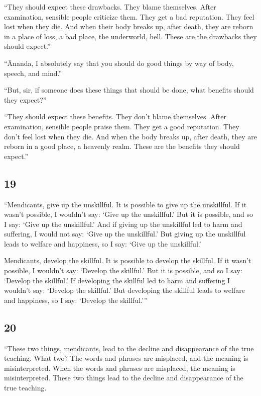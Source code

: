 \documentclass[12pt,openany]{book}%
\begin{document}
“They should expect these drawbacks. They blame themselves. After examination, sensible people criticize them. They get a bad reputation. They feel lost when they die. And when their body breaks up, after death, they are reborn in a place of loss, a bad place, the underworld, hell. These are the drawbacks they should expect.” 

“Ānanda, I absolutely say that you should do good things by way of body, speech, and mind.” 

“But, sir, if someone does these things that should be done, what benefits should they expect?” 

“They should expect these benefits. They don’t blame themselves. After examination, sensible people praise them. They get a good reputation. They don’t feel lost when they die. And when the body breaks up, after death, they are reborn in a good place, a heavenly realm. These are the benefits they should expect.” 

\subsection*{19 }

“Mendicants, give up the unskillful. It is possible to give up the unskillful. If it wasn’t possible, I wouldn’t say: ‘Give up the unskillful.’ But it is possible, and so I say: ‘Give up the unskillful.’ And if giving up the unskillful led to harm and suffering, I would not say: ‘Give up the unskillful.’ But giving up the unskillful leads to welfare and happiness, so I say: ‘Give up the unskillful.’ 

Mendicants, develop the skillful. It is possible to develop the skillful. If it wasn’t possible, I wouldn’t say: ‘Develop the skillful.’ But it is possible, and so I say: ‘Develop the skillful.’ If developing the skillful led to harm and suffering I wouldn’t say: ‘Develop the skillful.’ But developing the skillful leads to welfare and happiness, so I say: ‘Develop the skillful.’” 

\subsection*{20 }

“These two things, mendicants, lead to the decline and disappearance of the true teaching. What two? The words and phrases are misplaced, and the meaning is misinterpreted. When the words and phrases are misplaced, the meaning is misinterpreted. These two things lead to the decline and disappearance of the true teaching. 
\end{document}
